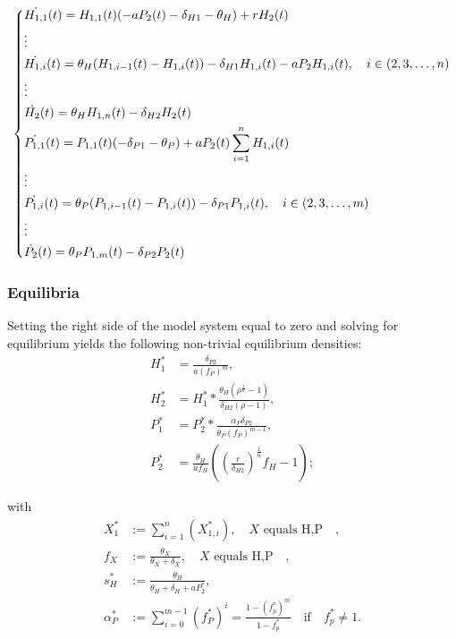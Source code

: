 \documentclass[12pt,a4paper,onecolumn]{article}
\begin{document}
\begin{equation}
\begin{dcases}
\dot{H_{1,1}}(t) = H_{1,1}(t)(-a P_2(t) - \delta_{H1} - \theta_H) + r H_2(t) \\
\vdots \\
\dot{H_{1,i}}(t) = \theta_H(H_{1,i-1}(t) - H_{1,i}(t)) - \delta_{H1} H_{1,i}(t) - aP_2H_{1,i}(t), \quad i \in (2, 3, \dots, n) \\
\vdots \\
\dot{H_{2}}(t) = \theta_H H_{1,n}(t) - \delta_{H2} H_{2}(t) \\
\dot{P_{1,1}}(t) = P_{1,1}(t)(- \delta_{P1} - \theta_P) + a P_2(t) \sum_{i=1}^{n} H_{1,i}(t) \\
\vdots \\
\dot{P_{1,i}}(t) = \theta_P(P_{1,i-1}(t) - P_{1,i}(t)) - \delta_{P1} P_{1,i}(t), \quad i \in (2, 3, \dots, m) \\
\vdots \\
\dot{P_{2}}(t) = \theta_P P_{1,m}(t) - \delta_{P2} P_{2}(t) \\
\end{dcases}
\end{equation}

\subsubsection{Equilibria}

Setting the right side of the model system equal to zero and solving for equilibrium yields the following non-trivial equilibrium densities:
\begin{align}
H_1^* &= \frac{\delta_{P2}}{a(f_P)^m}, \nonumber \\
H_2^* &= H_1^* * \frac{\theta_{H} (\rho^{\frac{1}{n}}-1)}{\delta_{H2} (\rho-1)}, \nonumber \\
P_1^* &= P_2^* * \frac{\alpha_P \delta_{P2}}{\theta_P (f_P)^{m-1}},  \\
P_2^*&= \frac{\theta_H}{a f_H} ((\frac{r}{\delta_{H2}})^{\frac{1}{n}}f_H -1); \nonumber
\end{align}

with 
\begin{align}
X_1^* &:= \sum_{i=1}^{n} (X_{1,i}^*), \quad \text{$X$ equals H,P} \quad ,  \nonumber  \\
f_X &:= \frac{\theta_X}{\theta_X + \delta_X}, \quad \text{$X$ equals H,P} \quad , \nonumber \\
s_H^* &:= \frac{\theta_H}{\theta_H + \delta_H + aP_2^*},  \\
\alpha_P^* &:= \sum_{i=0}^{m-1} (f_P^*)^i = \frac{1-(f_p^*)^m}{1-f_p^*} \quad \text{if} \quad f_p^* \neq 1 . \nonumber
\end{align}
\end{document}
